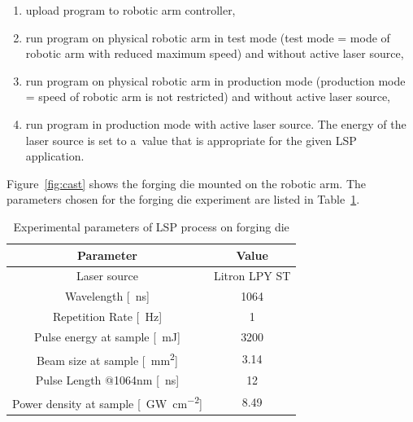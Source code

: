 \begin{enumerate}
    
\item upload program to robotic arm controller,

\item run program on physical robotic arm in test mode (test mode = mode of robotic arm with reduced maximum speed) and without active laser source,

\item run program on physical robotic arm in production mode (production mode = speed of robotic arm is not restricted) and without active laser source,

\item run program in production mode with active laser source. The energy of the laser source is set to a~value that is appropriate for the given LSP application. 

\end{enumerate}
Figure~\ref{fig:cast} shows the forging die mounted on the robotic arm. The parameters chosen for the forging die experiment are listed in Table~\ref{experimental_forging}. 

\begin{table}[h!]
\centering
    \begin{threeparttable}
        \begin{tabular}{|c | c|} 
        \hline
            \textbf{Parameter} & \textbf{Value} \\ [0.5ex] 
        \hline
        Laser source & Litron LPY ST  \\
        \hline
        Wavelength [\SI{}{\nano\second}] & 1064 \\
        \hline
        Repetition Rate [\SI{}{\hertz}] & 1  \\ 
        \hline
            Pulse energy at sample [\SI{}{\milli\joule}] & 3200 \\
        \hline
            Beam size at sample [\SI{}{\mm\squared}] & 3.14 \\
        \hline
            Pulse Length @1064nm [\SI{}{\nano\second}] & 12 \\
        \hline
            Power density at sample [\SI{}{\giga\watt\per\cm\squared}] & 8.49 \\

        \hline
        \end{tabular}

        \caption{Experimental parameters of LSP process on \mbox{forging} die}
        \label{experimental_forging}
    \end{threeparttable}
\end{table}

